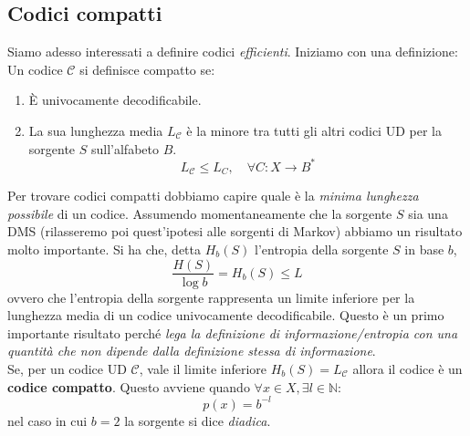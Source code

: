 \subsection{Codici compatti}
Siamo adesso interessati a definire codici \textit{efficienti}. Iniziamo con una definizione:
 Un codice $\mathcal{C}$ si definisce compatto se: 
\begin{enumerate}
    \item \`E univocamente decodificabile.
    \item La sua lunghezza media $L_{\mathcal{C}}$ \`e la minore tra tutti gli altri codici UD per la sorgente $S$ sull'alfabeto $B$.
    \[
    L_{\mathcal{C}} \leq L_C, \quad \forall C: X \to B^*
    \]
\end{enumerate}
Per trovare codici compatti dobbiamo capire quale è la \textit{minima lunghezza possibile} di un codice. Assumendo momentaneamente che la sorgente $S$ sia una DMS (rilasseremo poi quest'ipotesi alle sorgenti di Markov) abbiamo un risultato molto importante. Si ha che, detta $H_b (S)$ l'entropia della sorgente $S$ in base $b$, 
\begin{equation}
    \frac{H(S)}{\log b} = H_b (S) \leq L
\end{equation}
ovvero che l'entropia della sorgente rappresenta un limite inferiore per la lunghezza media di un codice univocamente decodificabile. Questo  è  un  primo  importante  risultato  perché  \textit{lega  la  definizione  di  informazione/entropia  con  una quantità che non dipende dalla definizione stessa di informazione}.\\
Se, per un codice UD $\mathcal{C}$, vale il limite inferiore $H_b(S) = L_{\mathcal{C}}$ allora il codice \`e un \textbf{codice compatto}. Questo avviene quando $\forall x \in X, \exists l \in \mathbb{N}:$
\begin{equation*}
   p(x) = b^{-l}
\end{equation*}
nel caso in cui $b=2$ la sorgente si dice \textit{diadica}.
